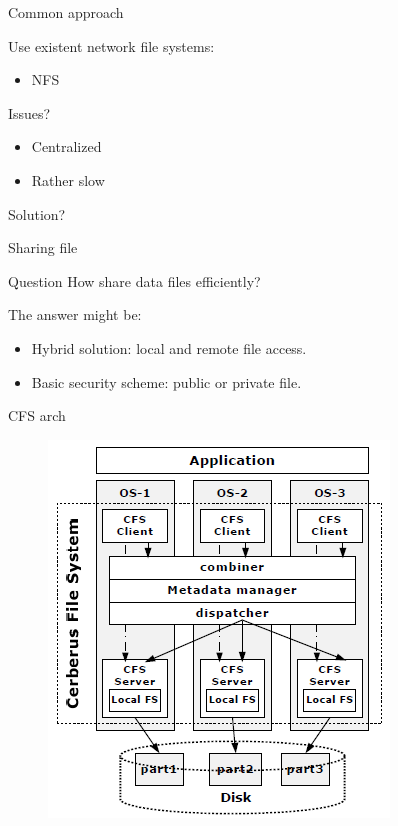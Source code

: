 \documentclass{beamer}
\begin{document}
	\begin{frame}{Common approach}	
	
		Use existent network file systems:
		\begin{itemize}
		\item NFS
		\end{itemize}
		
		Issues?
		\begin{itemize}
		\item Centralized
		\item Rather slow
		\end{itemize}		

		\begin{alertblock}{}
			Solution?
		\end{alertblock}

	\end{frame}	
	
	\begin{frame}{Sharing file}	
	
		\begin{block}{Question}
			How share data files efficiently?
		\end{block}
		
		The answer might be:		
		\begin{itemize}
		\item Hybrid solution: local and remote file access.
		\item Basic security scheme: public or private file.
		\end{itemize}

	\end{frame}

	\begin{frame}{CFS arch}

		\begin{figure} [H]
			\centering
			\includegraphics[scale=0.40]{img/cerberus-cfs}
		\end{figure}	

	\end{frame}
\end{document}
